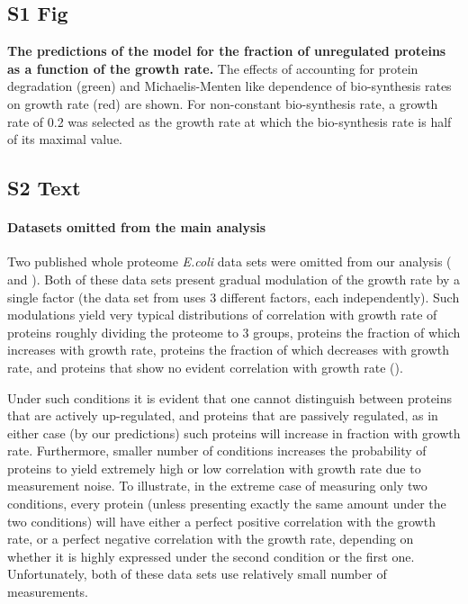 \documentclass[10pt,letterpaper]{article}
\begin{document}
\subsection*{S1 Fig}
\label{fig:theoreticalpred}
    {\bf The predictions of the model for the fraction of unregulated proteins as a function of the growth rate.}
The effects of accounting for protein degradation (green) and Michaelis-Menten like dependence of bio-synthesis rates on growth rate (red) are shown.
For non-constant bio-synthesis rate, a growth rate of 0.2 was selected as the growth rate at which the bio-synthesis rate is half of its maximal value.%

\subsection*{S2 Text}
\label{furtherdatasetanalysis}
\paragraph{Datasets omitted from the main analysis}
Two published whole proteome \emph{E.coli} data sets were omitted from our analysis (\cite{Valgepea2013} and \cite{Hui_2015}).
Both of these data sets present gradual modulation of the growth rate by a single factor (the data set from \cite{Hui_2015} uses 3 different factors, each independently).
Such modulations yield very typical distributions of correlation with growth rate of proteins roughly dividing the proteome to 3 groups, proteins the fraction of which increases with growth rate, proteins the fraction of which decreases with growth rate, and proteins that show no evident correlation with growth rate ().

Under such conditions it is evident that one cannot distinguish between proteins that are actively up-regulated, and proteins that are passively regulated, as in either case (by our predictions) such proteins will increase in fraction with growth rate.
Furthermore, smaller number of conditions increases the probability of proteins to yield extremely high or low correlation with growth rate due to measurement noise.
To illustrate, in the extreme case of measuring only two conditions, every protein (unless presenting exactly the same amount under the two conditions) will have either a perfect positive correlation with the growth rate, or a perfect negative correlation with the growth rate, depending on whether it is highly expressed under the second condition or the first one.
Unfortunately, both of these data sets use relatively small number of measurements.
\end{document}
